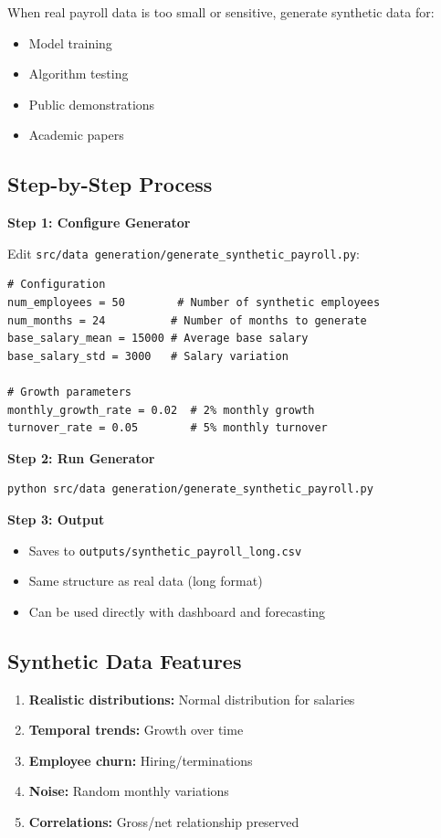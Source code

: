When real payroll data is too small or sensitive, generate synthetic data for:
\begin{itemize}
    \item Model training
    \item Algorithm testing
    \item Public demonstrations
    \item Academic papers
\end{itemize}

\subsection{Step-by-Step Process}

\textbf{Step 1: Configure Generator}

Edit \texttt{src/data generation/generate\_synthetic\_payroll.py}:

\begin{lstlisting}[style=pythonstyle]
# Configuration
num_employees = 50        # Number of synthetic employees
num_months = 24          # Number of months to generate
base_salary_mean = 15000 # Average base salary
base_salary_std = 3000   # Salary variation

# Growth parameters
monthly_growth_rate = 0.02  # 2% monthly growth
turnover_rate = 0.05        # 5% monthly turnover
\end{lstlisting}

\textbf{Step 2: Run Generator}

\begin{lstlisting}
python src/data generation/generate_synthetic_payroll.py
\end{lstlisting}

\textbf{Step 3: Output}

\begin{itemize}
    \item Saves to \texttt{outputs/synthetic\_payroll\_long.csv}
    \item Same structure as real data (long format)
    \item Can be used directly with dashboard and forecasting
\end{itemize}

\subsection{Synthetic Data Features}

\begin{enumerate}
    \item \textbf{Realistic distributions:} Normal distribution for salaries
    \item \textbf{Temporal trends:} Growth over time
    \item \textbf{Employee churn:} Hiring/terminations
    \item \textbf{Noise:} Random monthly variations
    \item \textbf{Correlations:} Gross/net relationship preserved
\end{enumerate}

